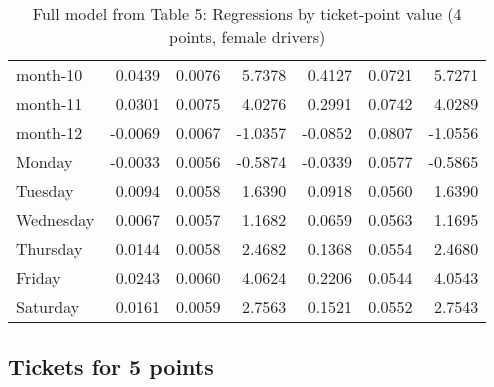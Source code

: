 \documentclass[10pt]{article}
\begin{document}
\begin{table}[ht]
\begin{tabular}{lrrrrrr}
  month-10 & 0.0439 & 0.0076 & 5.7378 & 0.4127 & 0.0721 & 5.7271 \\ 
  month-11 & 0.0301 & 0.0075 & 4.0276 & 0.2991 & 0.0742 & 4.0289 \\ 
  month-12 & -0.0069 & 0.0067 & -1.0357 & -0.0852 & 0.0807 & -1.0556 \\ 
  Monday & -0.0033 & 0.0056 & -0.5874 & -0.0339 & 0.0577 & -0.5865 \\ 
  Tuesday & 0.0094 & 0.0058 & 1.6390 & 0.0918 & 0.0560 & 1.6390 \\ 
  Wednesday & 0.0067 & 0.0057 & 1.1682 & 0.0659 & 0.0563 & 1.1695 \\ 
  Thursday & 0.0144 & 0.0058 & 2.4682 & 0.1368 & 0.0554 & 2.4680 \\ 
  Friday & 0.0243 & 0.0060 & 4.0624 & 0.2206 & 0.0544 & 4.0543 \\ 
  Saturday & 0.0161 & 0.0059 & 2.7563 & 0.1521 & 0.0552 & 2.7543 \\ 
   \hline
\end{tabular}
\caption{Full model from Table 5: Regressions by ticket-point value (4 points, female drivers)} 
\label{tab_5_4_pts_no_age_F}
\end{table}


\clearpage
\pagebreak




\subsection{Tickets for 5 points}



\end{document}

